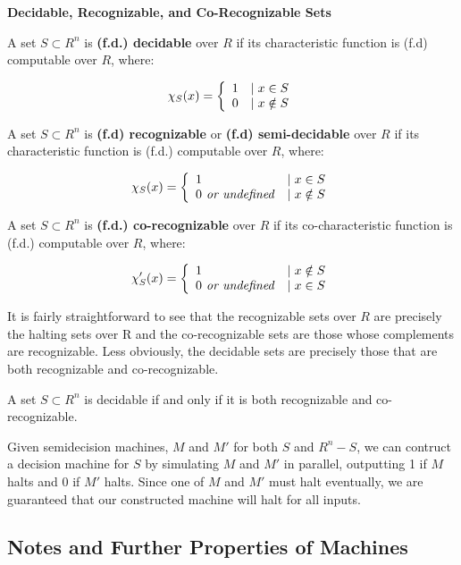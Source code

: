 \begin{definition}{\textbf{Decidable, Recognizable, and Co-Recognizable Sets}}
  
  A set $S \subset R^n$ is \textbf{(f.d.) decidable} over $R$ if its
  characteristic function  is (f.d)
  computable over $R$, where:
  
  $$\chi_S(x) =  \left\{ \begin{array}{ll} 1 & \mid x \in S \\ 0 & \mid x \notin S \end{array} \right.$$
  
  A set $S \subset R^n$ is \textbf{(f.d) recognizable} or
  \textbf{(f.d) semi-decidable} over $R$ if its characteristic
  function  is (f.d.) computable over $R$,
  where:
  
  $$\chi_S(x) =  \left\{ \begin{array}{ll} 1 & \mid x \in S \\ 0 \text{\emph{ or undefined}} & \mid x \notin S \end{array} \right.$$
  
  A set $S \subset R^n$ is \textbf{(f.d.) co-recognizable} over $R$
  if its co-characteristic function  is (f.d.)
  computable over $R$, where:
  
  $$\chi'_S(x) =  \left\{ \begin{array}{ll} 1 & \mid x \notin S \\ 0 \text{\emph{ or undefined}} & \mid x \in S \end{array} \right.$$
  
\end{definition}

It is fairly straightforward to see that the recognizable sets over
$R$ are precisely the halting sets over R and the co-recognizable sets
are those whose complements are recognizable. Less obviously, the
decidable sets are precisely those that are both recognizable and
co-recognizable.

\begin{proposition}{A set $S \subset R^n$ is decidable if and only if it is
  both recognizable and co-recognizable.}
\end{proposition}
\begin{proofsketch}
  
  Given semidecision machines, $M$ and $M'$ for both $S$ and $R^n -
  S$, we can contruct a decision machine for $S$ by simulating $M$ and
  $M'$ in parallel, outputting 1 if $M$ halts and 0 if $M'$ halts.
  Since one of $M$ and $M'$ must halt eventually, we are guaranteed
  that our constructed machine will halt for all inputs.


\end{proofsketch}

\subsection{Notes and Further Properties of Machines}

